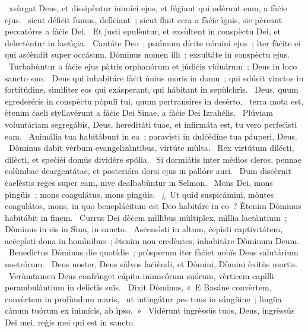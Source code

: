 \psalmChapterWithInscription{}
{ }
{%
~xsùrgat Deus, et dissipèntur inimíci ejus, et fúġiant qui odérunt eum, a fàċie ejus. 
~sicut défiċit fumus, defìċiant~; sicut fluit cera a fàċie ìgnis, sic pèreant peccatóres a fàċie Dei. 
~Et justi epulèntur, et exsùltent in conspèctu Dei, et delectèntur in laetìçia. 
~Cantáte Deo~; psalmum dícite nómini ejus~; ìter fàċite ei qui asċèndit super occásum. Dòminus nomen illi~; exsultáte in conspèctu ejus. 
~Turbabùntur a fàċie ejus pàtris orphanórum et júdiċis viduárum~; Deus in loco sancto suo. 
~Deus qui inhabitáre fàċit únius moris in domu~; qui edúcit vinctos in fortitúdine, simìliter eos qui exásperant, qui hábitant in sepùlchrïs. 
~Deus, quum egrederéris in conspèctu pòpuli tui, quum pertransíres in desèrto, 
~terra mota est, ètenim ċaeli styllavérunt a fàċie Dei Sinae, a fàċie Dei Izrahélis. 
~Plúviam voluntáriam segregábis, Deus, hereditáti tuae, et infirmáta est, tu vero perfeċìsti eam. 
~Animália tua habitábunt in ea~; paravìsti in dulċédine tua páuperi, Deus. 
~Dòminus dabit vèrbum evanġelizàntibus, virtúte mùlta. 
~Rex virtútum dilécti, dilècti, et speċiéi domüs dividére spólia. 
~Si dormiátis inter mèdios cleros, pennae colùmbae dearġentátae, et posterióra dorsi ejus in pallóre auri. 
~Dum disċèrnit ċaelèstis reġes super eam, nive dealbabùntur in Selmon. 
~Mons Dei, mons pìngüis~; mons coagulátus, mons pingüis. 
~¿~Ut quid suspicámini, mòntes coagulátos, mons, in quo benepláċitum est Deo habitáre in eo~? Ètenim Dòminus habitábit in finem. 
~Currus Dei dèċem mìllibus mùltiplex, mìllia laetàntium~; Dòminus in eïs in Sina, in sancto. 
~Asċensìsti in altum, ċepìsti captivitátem, acċepìsti dona in homìnibus~; ètenim non credèntes, inhabitáre Dòminum Deum. 
~Benedìctus Dòminus die quotídie~; pròsperum ìter fàċiet nobïs Deus salutárium nostrórum. 
~Deus noster, Deus sàlvos faċièndi, et Dòmini, Dòmini èxitüs mortis. 
~Verùmtamen Deus confrìnget cápita inimicórum suórum, vèrticem capìlli perambulàntium in delìctïs suïs. 
~Dixit Dòminus, «~E Basáne convèrtem, convèrtem in profùndum maris, 
~ut intingátur pes tuus in sángüine~; lìngüa cànum tuórum ex inimícïs, ab ìpso.~»
~Vidérunt ingrèssüs tuos, Deus, ingrèssüs Dei mei, reġis mei qui est in sancto. 
}
